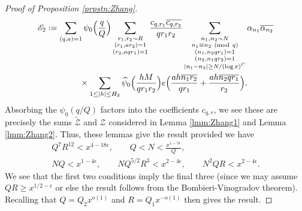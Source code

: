 \documentclass[10pt]{amsart}
\theoremstyle{plain}
\numberwithin{equation}{section}
\newcommand{\Mod}[1]{\ (\mathrm{mod}\ #1)}
\renewcommand{\hat}[1]{\widehat #1}
\begin{document}
\begin{proof}[Proof of Proposition \ref{prpstn:Zhang}]
\begin{align*}
\mathscr{E}_2&:=\sum_{\substack{(q,a)=1}}\psi_0\Bigl(\frac{q}{Q}\Bigr)\sum_{\substack{r_1,r_2\sim R\\ (r_1,a r_2)=1\\ (r_2,a q r_1)=1}}\frac{c_{q,r_1}\overline{c_{q,r_2}}}{q r_1 r_2}\sum_{\substack{n_1,n_2\sim N\\ n_1\equiv n_2\Mod{q}\\ (n_1,n_2 q r_1)=1\\(n_2,n_1 q r_2)=1\\ |n_1-n_2|\ge N/(\log{x})^C}}\alpha_{n_1}\overline{\alpha_{n_2}}\\
&\qquad\qquad \times\sum_{1\le |h|\le H_2}\hat{\psi}_0\Bigl(\frac{h M}{q r_1 r_2}\Bigr)e\Bigl(\frac{ah\overline{n_1r_2}}{q r_1}+\frac{ah\overline{n_2 q r_1}}{r_2}\Bigr).
\end{align*}
Absorbing the $\psi_0(q/Q)$ factors into the coefficients $c_{q,r}$, we see these are precisely the sums $\widetilde{\mathscr{Z}}$ and $\mathscr{Z}$ considered in Lemma \ref{lmm:Zhang1} and Lemma \ref{lmm:Zhang2}. Thus, these lemmas give the result provided we have
\begin{align*}
Q^{7} R^{12}< x^{4-18\epsilon},\qquad 
Q<N<\frac{x^{1-5\epsilon}}{Q},\\
N Q < x^{1-4\epsilon},\qquad
N Q^{5/2}R^3< x^{2-4\epsilon},\qquad
N^2 Q R<x^{2-4\epsilon}.
\end{align*}
We see that the first two conditions imply the final three (since we may assume $QR\ge x^{1/2-\epsilon}$ or else the result follows from the Bombieri-Vinogradov theorem). Recalling that $Q=Q_2 x^{o(1)}$ and $R=Q_1 x^{-o(1)}$ then gives the result.
\end{proof}
%
%
%
%
%
%
%
%
%
%
%
%
%
%
%
%
%
%
%
\end{document}
